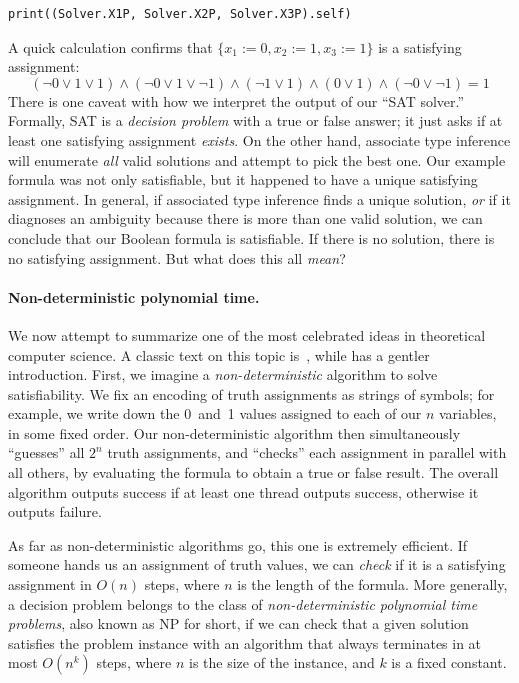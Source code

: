 \documentclass[../generics]{subfiles}
\begin{document}
\begin{Verbatim}
print((Solver.X1P, Solver.X2P, Solver.X3P).self)
\end{Verbatim}
A quick calculation confirms that $\{x_1 := 0, x_2 := 1, x_3 := 1\}$ is a satisfying assignment:
\[
(\neg 0 \vee 1 \vee 1) \wedge (\neg 0 \vee 1 \vee \neg 1) \wedge (\neg 1 \vee 1) \wedge (0 \vee 1) \wedge (\neg 0 \vee \neg 1) = 1
\]
There is one caveat with how we interpret the output of our ``SAT solver.'' Formally, SAT is a \emph{decision problem} with a true or false answer; it just asks if at least one satisfying assignment \emph{exists}. On the other hand, associate type inference will enumerate \emph{all} valid solutions and attempt to pick the best one. Our example formula was not only satisfiable, but it happened to have a unique satisfying assignment. In general, if associated type inference finds a unique solution, \emph{or} if it diagnoses an ambiguity because there is more than one valid solution, we can conclude that our Boolean formula is satisfiable. If there is no solution, there is no satisfying assignment. But what does this all \emph{mean}?

\begin{listing}\label{listing:sat}
\end{listing}

\paragraph{Non-deterministic polynomial time.} We now attempt to summarize one of the most celebrated ideas in theoretical computer science. A classic text on this topic is~\cite{garey1979computers}, while \cite{maccormick2018can} has a gentler introduction. First, we imagine a \emph{non-deterministic} algorithm to solve satisfiability. We fix an encoding of truth assignments as strings of symbols; for example, we write down the 0~and~1 values assigned to each of our $n$ variables, in some fixed order. Our non-deterministic algorithm then simultaneously ``guesses'' all $2^n$ truth assignments, and ``checks'' each assignment in parallel with all others, by evaluating the formula to obtain a true or false result. The overall algorithm outputs success if at least one thread outputs success, otherwise it outputs failure.

As far as non-deterministic algorithms go, this one is extremely efficient. If someone hands us an assignment of truth values, we can \emph{check} if it is a satisfying assignment in $O(n)$ steps, where $n$ is the length of the formula. More generally, a decision problem belongs to the class of \emph{non-deterministic polynomial time problems}, also known as NP for short, if we can check that a given solution satisfies the problem instance with an algorithm that always terminates in at most $O(n^k)$ steps, where $n$ is the size of the instance, and $k$ is a fixed constant.
\end{document}
